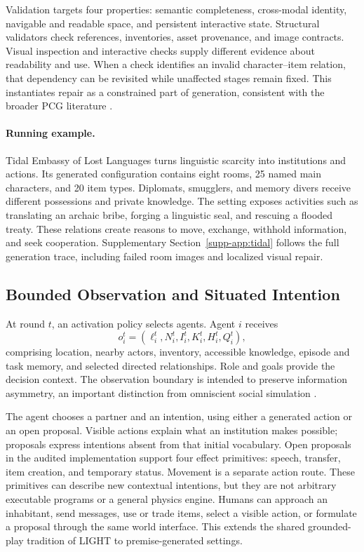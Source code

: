 Validation targets four properties: semantic completeness, cross-modal
identity, navigable and readable space, and persistent interactive state.
Structural validators check references, inventories, asset provenance, and
image contracts. Visual inspection and interactive checks supply different
evidence about readability and use. When a check identifies an invalid
character--item relation, that dependency can be revisited while unaffected
stages remain fixed. This instantiates repair as a constrained part of
generation, consistent with the broader PCG literature \cite{pcgml}.

\paragraph{Running example.}
Tidal Embassy of Lost Languages turns linguistic scarcity into institutions
and actions. Its generated configuration contains eight rooms, 25 named main
characters, and 20 item types. Diplomats, smugglers, and memory divers receive
different possessions and private knowledge. The setting exposes activities
such as translating an archaic bribe, forging a linguistic seal, and rescuing
a flooded treaty. These relations create reasons to move, exchange, withhold
information, and seek cooperation. Supplementary Section~\ref{supp-app:tidal} follows the full
generation trace, including failed room images and localized visual repair.

\subsection{Bounded Observation and Situated Intention}
At round $t$, an activation policy selects agents. Agent $i$ receives
\begin{equation}
o_i^t=(\ell_i^t,N_i^t,I_i^t,K_i^t,H_i^t,Q_i^t),
\end{equation}
comprising location, nearby actors, inventory, accessible knowledge, episode
and task memory, and selected directed relationships. Role and goals provide
the decision context. The observation boundary is intended to preserve
information asymmetry, an important distinction from omniscient social
simulation \cite{misleading}.

The agent chooses a partner and an intention, using either a generated action
or an open proposal. Visible actions explain what an institution makes
possible; proposals express intentions absent from that initial vocabulary.
Open proposals in the audited implementation support four effect primitives:
speech, transfer, item creation, and temporary status. Movement is a separate
action route. These primitives can describe new contextual intentions, but
they are not arbitrary executable programs or a general physics engine. Humans can approach an inhabitant, send messages, use or trade
items, select a visible action, or formulate a proposal through the same world
interface. This extends the shared grounded-play tradition of LIGHT
\cite{light} to premise-generated settings.

